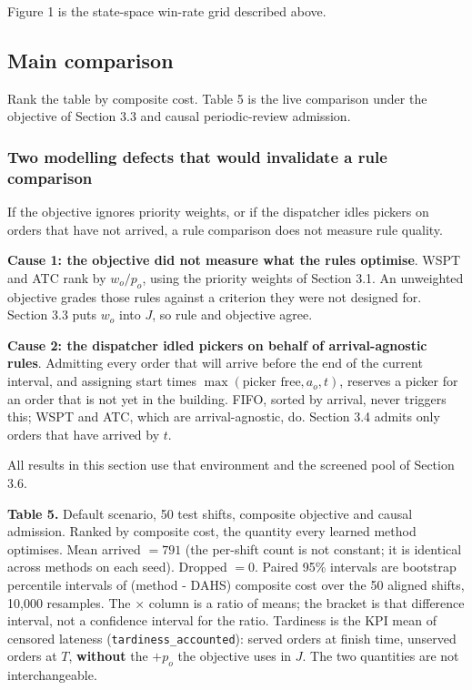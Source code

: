 \documentclass[review,3p,times]{elsarticle}
\theoremstyle{definition}
\begin{document}
Figure 1 is the state-space win-rate grid described above.

\subsection{Main comparison}\label{main-comparison}

Rank the table by composite cost. Table 5 is the live comparison under
the objective of Section 3.3 and causal periodic-review admission.

\subsubsection{Two modelling defects that would invalidate a rule
comparison}\label{two-modelling-defects-that-would-invalidate-a-rule-comparison}

If the objective ignores priority weights, or if the dispatcher idles
pickers on orders that have not arrived, a rule comparison does not
measure rule quality.

\textbf{Cause 1: the objective did not measure what the rules optimise}.
WSPT and ATC rank by \(w_o/p_o\), using the priority weights of Section
3.1. An unweighted objective grades those rules against a criterion they
were not designed for. Section 3.3 puts \(w_o\) into \(J\), so rule and
objective agree.

\textbf{Cause 2: the dispatcher idled pickers on behalf of
arrival-agnostic rules}. Admitting every order that will arrive before
the end of the current interval, and assigning start times
\(\max(\text{picker free}, a_o, t)\), reserves a picker for an order
that is not yet in the building. FIFO, sorted by arrival, never triggers
this; WSPT and ATC, which are arrival-agnostic, do. Section 3.4 admits
only orders that have arrived by \(t\).

All results in this section use that environment and the screened pool
of Section 3.6.

\textbf{Table 5.} Default scenario, 50 test shifts, composite objective
and causal admission. Ranked by composite cost, the quantity every
learned method optimises. Mean arrived \(=791\) (the per-shift count is
not constant; it is identical across methods on each seed). Dropped
\(=0\). Paired 95\% intervals are bootstrap percentile intervals of
(method - DAHS) composite cost over the 50 aligned shifts, 10,000
resamples. The × column is a ratio of means; the bracket is that
difference interval, not a confidence interval for the ratio. Tardiness
is the KPI mean of censored lateness (\texttt{tardiness\_accounted}):
served orders at finish time, unserved orders at \(T\), \textbf{without}
the \(+p_o\) the objective uses in \(J\). The two quantities are not
interchangeable.
\end{document}
